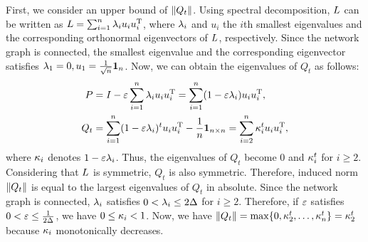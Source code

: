 \documentclass[journal]{IEEEtran}
\begin{document}
First, we consider an upper bound of $\Dist{Q_t}$.
Using spectral decomposition, $\Laplacian$ can be written as $\Laplacian=\sum_{i=1}^\NumU \eigen_i u_i u_i^\Trans$,
where $\eigen_i$ and $u_i$ the $i$th smallest eigenvalues and the corresponding orthonormal eigenvectors of $\Laplacian$, respectively.
Since the network graph is connected, the smallest eigenvalue and the corresponding eigenvector satisfies
$\eigen_1=0, u_1=\frac{1}{\sqrt{\NumU}}\Ones[\NumU]$.
Now, we can obtain the eigenvalues of $Q_t$ as follows:
\begin{align}
  P   &= I - \lrc \sum_{i=1}^\NumU \eigen_i u_i u_i^\Trans
      = \sum_{i=1}^\NumU (1 - \lrc \eigen_i) u_i u_i^\Trans, \\
  Q_t &= \sum_{i=1}^\NumU (1 - \lrc \eigen_i)^t u_i u_i^\Trans - \frac{1}{\NumU} \Ones
      = \sum_{i=2}^\NumU \eigenQ_i^t u_i u_i^\Trans,
\end{align}
where $\eigenQ_i$ denotes $1-\lrc \eigen_i$.
Thus, the eigenvalues of $Q_t$ become $0$ and $\eigenQ_i^t$ for $i\ge2$.
Considering that $\Laplacian$ is symmetric, $Q_t$ is also symmetric.
Therefore, induced norm $\Dist{Q_t}$ is equal to the largest eigenvalues of $Q_t$ in absolute.
Since the network graph is connected, $\eigen_i$ satisfies $0 < \eigen_i\le 2\MaxD$ for $i\ge 2$.
Therefore, if $\lrc$ satisfies $0 < \lrc \le \frac{1}{2\MaxD}$, we have $0\le \eigenQ_i < 1$.
Now, we have $\Dist{Q_t}=\max\{0, \eigenQ_2^t, \dots, \eigenQ_{\NumU}^t\} = \convRate^t$ because $\eigenQ_i$ monotonically decreases.
\end{document}
